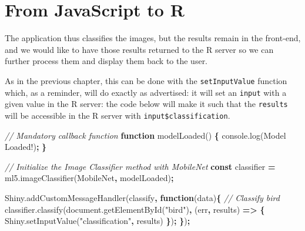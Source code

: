 \documentclass[
]{krantz}
\makeatletter
\newenvironment{Shaded}{\begin{snugshade}}{\end{snugshade}}
\newcommand{\AttributeTok}[1]{\textcolor[rgb]{0.61,0.61,0.61}{#1}}
\newcommand{\CommentTok}[1]{\textcolor[rgb]{0.37,0.37,0.37}{\textit{#1}}}
\newcommand{\KeywordTok}[1]{\textcolor[rgb]{0.27,0.27,0.27}{\textbf{#1}}}
\newcommand{\NormalTok}[1]{#1}
\newcommand{\OperatorTok}[1]{\textcolor[rgb]{0.43,0.43,0.43}{\textbf{#1}}}
\newcommand{\StringTok}[1]{\textcolor[rgb]{0.5,0.5,0.5}{#1}}
\newcommand{\VariableTok}[1]{\textcolor[rgb]{0,0,0}{#1}}
\newenvironment{kframe}{%
\medskip{}
\setlength{\fboxsep}{.8em}
 \def\at@end@of@kframe{}%
 \ifinner\ifhmode%
  \def\at@end@of@kframe{\end{minipage}}%
  \begin{minipage}{\columnwidth}%
 \fi\fi%
 \def\FrameCommand##1{\hskip\@totalleftmargin \hskip-\fboxsep
 \colorbox{shadecolor}{##1}\hskip-\fboxsep
     \hskip-\linewidth \hskip-\@totalleftmargin \hskip\columnwidth}%
 \MakeFramed {\advance\hsize-\width
   \@totalleftmargin\z@ \linewidth\hsize
   \@setminipage}}%
 {\par\unskip\endMakeFramed%
 \at@end@of@kframe}
\renewenvironment{Shaded}{\begin{kframe}}{\end{kframe}}
\makeatother
\begin{document}
\hypertarget{shiny-complete-js2r}{%
\section{From JavaScript to R}\label{shiny-complete-js2r}}

The application thus classifies the images, but the results remain in the front-end, and we would like to have those results returned to the R server so we can further process them and display them back to the user.

As in the previous chapter, this can be done with the \texttt{setInputValue} function which, as a reminder, will do exactly as advertised: it will set an \texttt{input} with a given value in the R server: the code below will make it such that the \texttt{results} will be accessible in the R server with \texttt{input\$classification}.

\begin{Shaded}
\begin{Highlighting}[]
\CommentTok{// Mandatory callback function}
\KeywordTok{function} \AttributeTok{modelLoaded}\NormalTok{() }\OperatorTok{\{}
  \VariableTok{console}\NormalTok{.}\AttributeTok{log}\NormalTok{(}\StringTok{\textquotesingle{}Model Loaded!\textquotesingle{}}\NormalTok{)}\OperatorTok{;}
\OperatorTok{\}}

\CommentTok{// Initialize the Image Classifier method with MobileNet}
\KeywordTok{const}\NormalTok{ classifier }\OperatorTok{=} \VariableTok{ml5}\NormalTok{.}\AttributeTok{imageClassifier}\NormalTok{(}\StringTok{\textquotesingle{}MobileNet\textquotesingle{}}\OperatorTok{,}\NormalTok{ modelLoaded)}\OperatorTok{;}

\VariableTok{Shiny}\NormalTok{.}\AttributeTok{addCustomMessageHandler}\NormalTok{(}\StringTok{\textquotesingle{}classify\textquotesingle{}}\OperatorTok{,} \KeywordTok{function}\NormalTok{(data)}\OperatorTok{\{}
  \CommentTok{// Classify bird}
  \VariableTok{classifier}\NormalTok{.}\AttributeTok{classify}\NormalTok{(}\VariableTok{document}\NormalTok{.}\AttributeTok{getElementById}\NormalTok{(}\StringTok{"bird"}\NormalTok{)}\OperatorTok{,}\NormalTok{ (err}\OperatorTok{,}\NormalTok{ results) }\KeywordTok{=>} \OperatorTok{\{}
    \VariableTok{Shiny}\NormalTok{.}\AttributeTok{setInputValue}\NormalTok{(}\StringTok{"classification"}\OperatorTok{,}\NormalTok{ results)}
  \OperatorTok{\}}\NormalTok{)}\OperatorTok{;}
\OperatorTok{\}}\NormalTok{)}\OperatorTok{;}
\end{Highlighting}
\end{Shaded}
\end{document}

